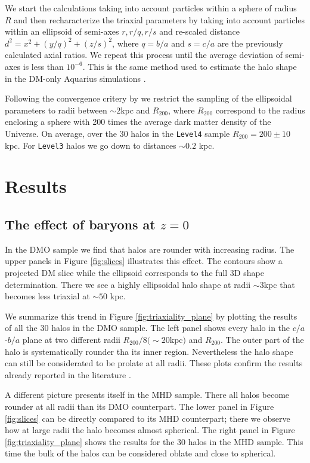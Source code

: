 \documentclass[a4paper,fleqn,usenatbib]{mnras}
\begin{document}
We start the calculations taking into account particles within a
sphere of radius $R$ and then recharacterize the triaxial parameters
by taking into account particles within an ellipsoid of semi-axes
$r,r/q,r/s$ and re-scaled distance $d^2=x^2+(y/q)^2+(z/s)^2$, where $q
= b/a$ and $s=c/a$ are the previously calculated axial ratios. 
We repeat this process until the average deviation of semi-axes is
less than $10^{-6}$.  
This is the same method used to estimate the halo shape in the DM-only
Aquarius simulations \citep{Vera-Ciro_et_al._2011}. 

Following the convergence critery by \cite{Vera-Crito_et_al.2011} we
restrict the sampling of the ellipsoidal parameters to radii  between
$\sim 2$kpc and $R_{200}$, where  $R_{200}$ correspond to the  radius
enclosing a sphere with 200 times the average dark matter density of
the Universe.  
On average, over the 30 halos in the \texttt{Level4} sample
$R_{200}=200\pm 10$kpc. 
For \texttt{Level3} halos we go down to distances $\sim 0.2$ kpc.  


\section{Results}

\subsection{The effect of baryons at $z=0$}

In the DMO sample we find that halos are rounder with increasing
radius.
The upper panels in Figure \ref{fig:slices} illustrates this effect.
The contours show a projected DM slice while the ellipsoid corresponds
to the full 3D shape determination. 
There we see a highly ellipsoidal halo shape at radii $\sim 3$kpc
that becomes less triaxial at $\sim 50$ kpc.


We summarize this trend in Figure \ref{fig:triaxiality_plane} by
plotting the results of all the 30 halos in the DMO sample.
The left panel shows every halo in the $c/a$-$b/a$ plane at
two different radii $R_{200}/8 (\sim 20$kpc$)$ and $R_{200}$. 
The outer part of the halo is systematically rounder tha its inner
region. 
Nevertheless the halo shape can still be considerated to be prolate at
all radii. 
These plots confirm the results already reported in the
literature \citep{Vera-Ciro_et_al._2011}.

A different picture presents itself in the MHD sample.
There all halos become rounder at all radii than its DMO
counterpart.
The lower panel in Figure \ref{fig:slices} can be directly compared to
its MHD counterpart; there we observe how at large radii the halo
becomes almost spherical. 
The right panel in Figure \ref{fig:triaxiality_plane} shows the
results for the 30 halos in the MHD sample.
This time the bulk of the halos can be considered oblate and close to
spherical. 
\end{document}
